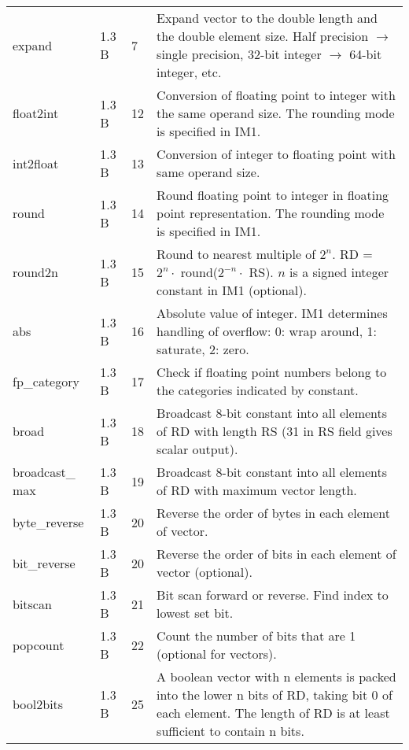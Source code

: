 \documentclass[forwardcom.tex]{subfiles}
\begin{document}
\begin{longtable} {|p{25mm}|p{14mm}|p{10mm}|p{95mm}|}
expand        & 1.3 B &  7 & Expand vector to the double length and the double element size. Half precision $\rightarrow$ single precision, 32-bit integer $\rightarrow$ 64-bit integer, etc. \\

float2int     & 1.3 B & 12 & Conversion of floating point to integer with the same operand size. The rounding mode is specified in IM1. \\
int2float     & 1.3 B & 13 & Conversion of integer to floating point with same operand size. \\

round         & 1.3 B & 14 & Round floating point to integer in floating point  representation. The rounding mode is specified in IM1. \\
round2n       & 1.3 B & 15 & Round to nearest multiple of $2^n$. \newline 
RD = $2^n\cdot$ round($2^{-n}\cdot$ RS). $n$ is a signed integer constant in IM1 (optional). \\
abs           & 1.3 B & 16 & Absolute value of integer. IM1 determines handling of overflow: 0: wrap around, 1: saturate, 2: zero. \\

fp\_category  & 1.3 B & 17 & Check if floating point numbers belong to the categories indicated by constant. \\

broad         & 1.3 B & 18 & Broadcast 8-bit constant into all elements of RD with length RS (31 in RS field gives scalar output). \\

broadcast\_ max & 1.3 B & 19 & Broadcast 8-bit constant into all elements of RD with maximum vector length. \\

byte\_reverse & 1.3 B & 20 & Reverse the order of bytes in each element of vector. \\
bit\_reverse  & 1.3 B & 20 & Reverse the order of bits in each element of vector (optional). \\

bitscan       & 1.3 B & 21 & Bit scan forward or reverse. Find index to lowest set bit. \\

popcount      & 1.3 B & 22 & Count the number of bits that are 1 (optional for vectors). \\

bool2bits     & 1.3 B & 25 & A boolean vector with n elements is packed into the lower n bits of RD, taking bit 0 of each element. The length of RD is at least sufficient to contain n bits. \\


\end{longtable}
\end{document}
